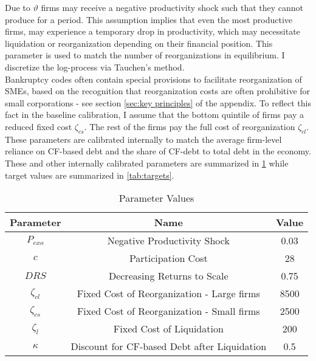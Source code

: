 \documentclass[12pt]{article}
\begin{document}
Due to $\vartheta$ firms may receive a negative productivity shock such that they cannot produce for a period. This assumption implies that even the most productive firms, may experience a temporary drop in productivity, which may necessitate liquidation or reorganization depending on their financial position. This parameter is used to match the number of reorganizations in equilibrium. I discretize the log-process via Tauchen's method. \vspace{3mm} \\ 
Bankruptcy codes often contain special provisions to facilitate reorganization of SMEs, based on the recognition that reorganization costs are often prohibitive for small corporations - see section \ref{sec:key principles} of the appendix. To reflect this fact in the baseline calibration, I assume that the bottom quintile of firms pay a reduced fixed cost $\zeta_{cs}$. The rest of the firms pay the full cost of reorganization $\zeta_{cl}$. These parameters are calibrated internally to match the average firm-level reliance on CF-based debt and the share of CF-debt to total debt in the economy. These and other internally calibrated parameters are summarized in \ref{tab:internal calib} while target values are summarized in \ref{tab:targets}.

\begin{table}[h!]
    \centering
    \begin{tabular}{c|c|c}
    \toprule
    \textbf{Parameter} & \textbf{Name} & \textbf{Value} \\
    \midrule
    $P_{exo}$ & Negative Productivity Shock & 0.03 \\
    $c$ & Participation Cost & 28 \\
   $ DRS$ & Decreasing Returns to Scale & 0.75 \\
    $\zeta_{cl}$ & Fixed Cost of Reorganization - Large firms & 8500 \\
    $\zeta_{cs}$ & Fixed Cost of Reorganization - Small firms & 2500 \\
    $\zeta_l$ & Fixed Cost of Liquidation & 200 \\
    $\kappa$ & Discount for CF-based Debt after Liquidation & 0.5 \\
    \bottomrule
    \end{tabular}
    \caption{Parameter Values}
    \label{tab:internal calib}
\end{table}
\end{document}
